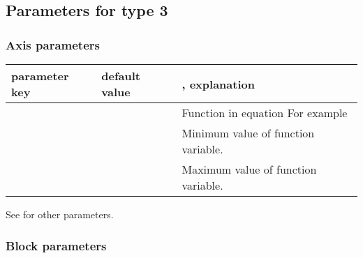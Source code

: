\documentclass[a4paper,11pt,english]{sphinxmanual}
\begin{document}
\subsection{Parameters for type 3}
\label{\detokenize{types/types:parameters-for-type-3}}

\subsubsection{Axis parameters}
\label{\detokenize{types/types:id9}}

\begin{savenotes}\sphinxattablestart
\centering
{}
\sphinxthecaptionisattop
{}\label{\detokenize{types/types:id56}}
\sphinxaftertopcaption
\begin{tabulary}{\linewidth}[t]{|p{4cm}|p{4cm}|p{7cm}|}
\hline
\sphinxstyletheadfamily 
parameter key
&\sphinxstyletheadfamily 
default value
&\sphinxstyletheadfamily 
{}, explanation
\\
\hline
{}
&
\textendash{}
&
 Function in equation For example 
\\
\hline
{}
&
\textendash{}
&
 Minimum value of function variable.
\\
\hline
{}
&
\textendash{}
&
 Maximum value of function variable.
\\
\hline
\end{tabulary}
\par
\sphinxattableend\end{savenotes}

See {\hyperref[\detokenize{axes/axes:common-axis-params}]{}} for other parameters.


\subsubsection{Block parameters}
\label{\detokenize{types/types:id10}}
\end{document}
